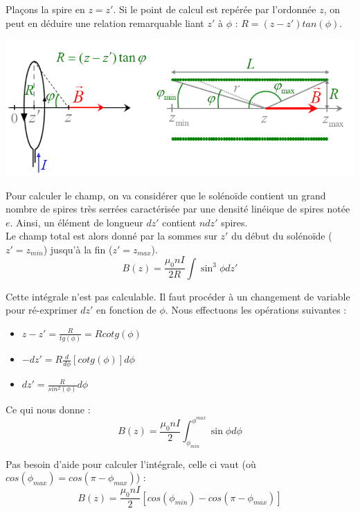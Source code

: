 \documentclass	[11pt, a4paper, openany]{book}
\begin{document}
Plaçons la spire en $z = z'$. Si le point de calcul est repérée par l'ordonnée $z$, on peut en déduire une relation remarquable liant $z'$ à $\phi$ : $R = (z - z')tan(\phi)$.

\begin{center}
	\includegraphics[scale=0.70]{magneto/image11.png}
\end{center}

Pour calculer le champ, on va considérer que le solénoïde contient un grand nombre de spires très serrées caractérisée par une densité linéique de spires notée $e$. Ainsi, un élément de longueur $dz'$ contient $ndz'$ spires.\\

Le champ total est alors donné par la sommes sur $z'$ du début du solénoïde ($z' = z_{min}$) jusqu'à la fin ($z' = z_{max}$).
\begin{equation}
	B(z) = \frac{\mu_0 nI}{2R}\int \sin^3\phi dz'
\end{equation}

Cette intégrale n'est pas calculable. Il faut procéder à un changement de variable pour ré-exprimer $dz'$ en fonction de $\phi$. Nous effectuons les opérations suivantes :
\begin{itemize}
	\item $z - z' = \frac{R}{tg(\phi)} = Rcotg(\phi)$
	\item $-dz' = R\frac{d}{d\phi}[cotg(\phi)]d\phi$
	\item $dz' = \frac{R}{sin^2(\phi)}d\phi$
\end{itemize}
Ce qui nous donne :
\begin{equation}
	B(z) = \frac{\mu_0 nI}{2}\int_{\phi_{min}}^{\phi^{max}} \sin\phi d\phi
\end{equation}

Pas besoin d'aide pour calculer l'intégrale, celle ci vaut (où $cos(\phi_{max}) = cos(\pi - \phi_{max})$) : 
\begin{equation}
	B(z) = \frac{\mu_0 nI}{2}[cos(\phi_{min}) - cos(\pi - \phi_{max})]
\end{equation}
\end{document}
